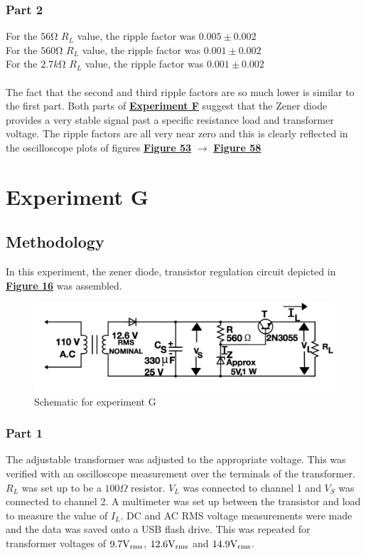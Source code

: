 \documentclass[
	letterpaper
	12pt
]{template}
\newcommand{\bref}[2]{\textbf{\hyperref[#1]{#2}}}
\begin{document}
\subsubsection{Part 2}

For the $56\unit{\ohm}$ $R_L$ value, the ripple factor was $0.005\pm0.002$\\
For the $560\unit{\ohm}$ $R_L$ value, the ripple factor was $0.001\pm0.002$\\
For the $2.7\unit{k\ohm}$ $R_L$ value, the ripple factor was $0.001\pm0.002$\\\\
The fact that the second and third ripple factors are so much lower is similar to the first part. Both parts of \bref{exp::F}{Experiment F} suggest that the Zener diode provides a very stable signal past a specific resistance load and transformer voltage. The ripple factors are all very near zero and this is clearly reflected in the oscilloscope plots of figures \bref{data::F4}{Figure 53} $\rightarrow$ \bref{data::F6}{Figure 58}



\section{Experiment G}\label{exp::G}
\subsection{Methodology}\label{method::G}
In this experiment, the zener diode, transistor regulation circuit depicted in \bref{apparatus::G}{Figure 16} was assembled.
\begin{figure}[H]\label{apparatus::G}
	\centering
	\begin{minipage}[c]{0.45\textwidth}
		\centering
		\includegraphics[width=\textwidth]{figures/G/schematic.png}
		\caption{Schematic for experiment G \\ \protect\cite{labManual}}
	\end{minipage}
\end{figure}
\subsubsection{Part 1}\label{method::G1}
The adjustable transformer was adjusted to the appropriate voltage. This was verified with an oscilloscope measurement over the terminals of the transformer. $R_L$ was set up to be a $100\Omega$ resistor. $V_L$ was connected to channel 1 and $V_S$ was connected to channel 2. A multimeter was set up between the transistor and load to measure the value of $I_L$. DC and AC RMS voltage measurements were made and the data was saved onto a USB flash drive. This was repeated for transformer voltages of $9.7\unit{\volt}_{\rm rms}$, $12.6\unit{\volt}_{\rm rms}$ and $14.9\unit{\volt}_{\rm rms}$.
\end{document}
